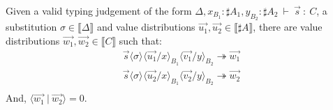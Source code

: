 \documentclass[runningheads,orivec]{llncs}
\newcommand\ansubst[2]{\ensuremath{\langle #1 \rangle_{#2}}}
\def\scal#1#2{\langle{#1}~|~{#2}\rangle}
\def\eval{\twoheadrightarrow}
\def\sem#1{\llbracket#1\rrbracket}
\def\TYP#1#2#3{#1~{\vdash}~#2~{:}~#3}
\begin{document}
\begin{lemma}\label{lem:OrthogonalSubstitution} %
Given a valid typing judgement of the form $\TYP{\Delta, x_{B_1}:\sharp A_1, y_{B_2}: \sharp A_2}{\vec{s}}{C}$, a substitution $\sigma\in\sem{\Delta}$ and value distributions $\vec{u_1},\vec{u_2}\in\sem{\sharp A}$, there are value distributions $\vec{w_1},\vec{w_2}\in\sem{C}$ such that:
\[
\begin{array}{c}
    \vec{s}\ansubst{\sigma}{}\ansubst{\vec{u_1}/x}{B_1}{\ansubst{\vec{v_1}/y}{B_2}}\eval\vec{w_1}\\
    \vec{s}\ansubst{\sigma}{}\ansubst{\vec{u_2}/x}{B_1}{\ansubst{\vec{v_2}/y}{B_2}}\eval\vec{w_2}\\
\end{array}
\]
And, $\scal{\vec{w_1}}{\vec{w_2}} = 0$.
\end{lemma}
\end{document}
